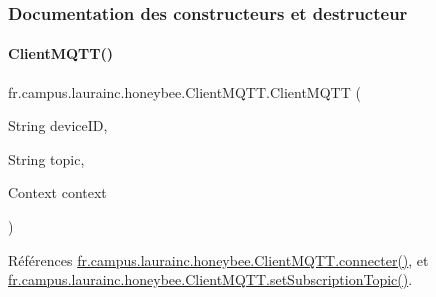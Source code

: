 \subsubsection{Documentation des constructeurs et destructeur}
\mbox{\label{classfr_1_1campus_1_1laurainc_1_1honeybee_1_1_client_m_q_t_t_a98cc7dce4cade9ffacfa462fe2f97088}} 
\paragraph{\texorpdfstring{Client\+M\+Q\+T\+T()}{ClientMQTT()}}
{\footnotesize\ttfamily fr.\+campus.\+laurainc.\+honeybee.\+Client\+M\+Q\+T\+T.\+Client\+M\+Q\+TT (\begin{DoxyParamCaption}\item[{String}]{device\+ID,  }\item[{String}]{topic,  }\item[{Context}]{context }\end{DoxyParamCaption})}



Références \hyperlink{classfr_1_1campus_1_1laurainc_1_1honeybee_1_1_client_m_q_t_t_ab514adf6ebb879734ee8f2b3b2fd106a}{fr.\+campus.\+laurainc.\+honeybee.\+Client\+M\+Q\+T\+T.\+connecter()}, et \hyperlink{classfr_1_1campus_1_1laurainc_1_1honeybee_1_1_client_m_q_t_t_af30038554905358c24a7226544822ff3}{fr.\+campus.\+laurainc.\+honeybee.\+Client\+M\+Q\+T\+T.\+set\+Subscription\+Topic()}.


